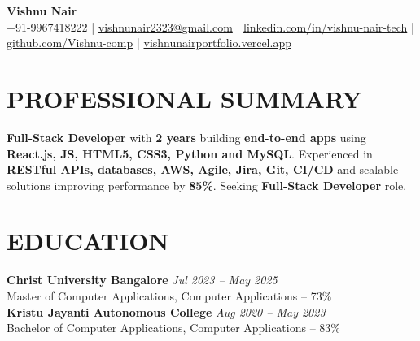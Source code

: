 \documentclass[10pt,a4paper]{article}
\begin{document}

\begin{center}

{\Large \textbf{Vishnu Nair}}\\[4pt]

{\small
+91-9967418222
\quad|\quad
\href{mailto:vishnunair2323@gmail.com}{vishnunair2323@gmail.com}
\quad|\quad
\href{https://linkedin.com/in/vishnu-nair-tech}{linkedin.com/in/vishnu-nair-tech}
\quad|\quad
\href{https://github.com/Vishnu-comp}{github.com/Vishnu-comp}
\quad|\quad
\href{https://vishnunairportfolio.vercel.app}{vishnunairportfolio.vercel.app}
}

\end{center}


\section*{PROFESSIONAL SUMMARY}

\small

\textbf{Full-Stack Developer} with \textbf{2 years} building \textbf{end-to-end apps} using \textbf{React.js, JS, HTML5, CSS3, Python and MySQL}. Experienced in \textbf{RESTful APIs, databases, AWS, Agile, Jira, Git, CI/CD} and scalable solutions improving performance by \textbf{85\%}. Seeking \textbf{Full-Stack Developer} role.


\section*{EDUCATION}
\small
\textbf{Christ University Bangalore} \hfill \textit{Jul 2023 -- May 2025}\\
Master of Computer Applications, Computer Applications -- 73\%\\
\small
\textbf{Kristu Jayanti Autonomous College} \hfill \textit{Aug 2020 -- May 2023}\\
Bachelor of Computer Applications, Computer Applications -- 83\%

\end{document}
